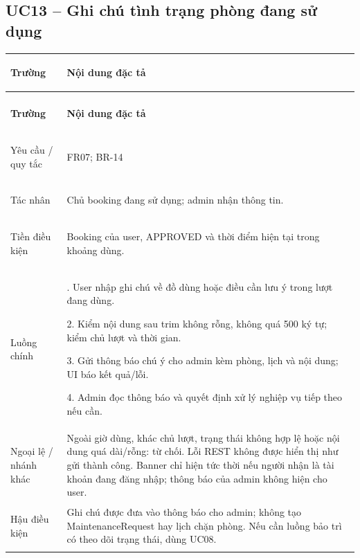 \subsection{UC13 -- Ghi chú tình trạng phòng đang sử dụng}\label{tab:uc13}
{\small\renewcommand{\arraystretch}{1.06}
\setlength{\tabcolsep}{6pt}\setlength{\extrarowheight}{2pt}
\renewcommand{\theHtable}{uc.\arabic{subsection}}\addtocounter{table}{-1}
\begin{longtable}{|>{\bfseries\raggedright\arraybackslash}p{3cm}|>{\raggedright\arraybackslash}p{\dimexpr\textwidth-3cm-4\tabcolsep-3\arrayrulewidth\relax}|}
\hline
\textbf{Trường} & \textbf{Nội dung đặc tả}\\\hline
\endfirsthead
\multicolumn{2}{r}{\small\itshape UC13 (tiếp)}\\
\hline
\textbf{Trường} & \textbf{Nội dung đặc tả}\\\hline
\endhead
\endlastfoot
Yêu cầu / quy tắc & FR07; BR-14\\*\hline
Tác nhân & Chủ booking đang sử dụng; admin nhận thông tin.\\*\hline
Tiền điều kiện & Booking của user, APPROVED và thời điểm hiện tại trong khoảng dùng.\\*\hline
Luồng chính & 1. User nhập ghi chú về đồ dùng hoặc điều cần lưu ý trong lượt đang dùng.\par
2. Kiểm nội dung sau trim không rỗng, không quá 500 ký tự; kiểm chủ lượt và thời gian.\par
3. Gửi thông báo chú ý cho admin kèm phòng, lịch và nội dung; UI báo kết quả/lỗi.\par
4. Admin đọc thông báo và quyết định xử lý nghiệp vụ tiếp theo nếu cần.\\\hline
Ngoại lệ / nhánh khác & Ngoài giờ dùng, khác chủ lượt, trạng thái không hợp lệ hoặc nội dung quá dài/rỗng: từ chối. Lỗi REST không được hiển thị như gửi thành công. Banner chỉ hiện tức thời nếu người nhận là tài khoản đang đăng nhập; thông báo của admin không hiện cho user.\\\hline
Hậu điều kiện & Ghi chú được đưa vào thông báo cho admin; không tạo MaintenanceRequest hay lịch chặn phòng. Nếu cần luồng bảo trì có theo dõi trạng thái, dùng UC08.\\\hline
\end{longtable}}
